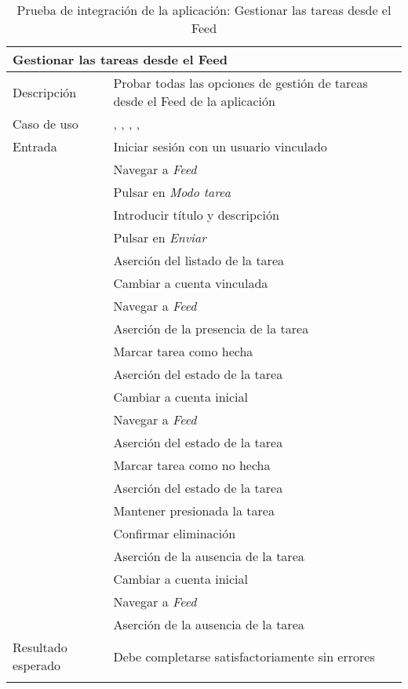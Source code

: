 \newpage
\begin{longtable}{|p{} p{}|}
    \hline
    \multicolumn{2}{|l|}{\textbf{Gestionar las tareas desde el Feed}} \\ \hline 
    Descripción                 & Probar todas las opciones de gestión de tareas desde el Feed de la aplicación \\ \hline
    Caso de uso                 & \nameref{cu:listar_tareas}, \nameref{cu:crear_tarea}, \nameref{cu:marcar_tarea}, \nameref{cu:desmarcar_tarea}, \nameref{cu:eliminar_tarea} \\ \hline
    Entrada                     & Iniciar sesión con un usuario vinculado \\
                                & Navegar a \emph{Feed} \\ 
                                & Pulsar en \emph{Modo tarea} \\
                                & Introducir título y descripción \\
                                & Pulsar en \emph{Enviar} \\
                                & Aserción del listado de la tarea \\
                                & Cambiar a cuenta vinculada \\
                                & Navegar a \emph{Feed} \\ 
                                & Aserción de la presencia de la tarea \\
                                & Marcar tarea como hecha \\
                                & Aserción del estado de la tarea \\
                                & Cambiar a cuenta inicial \\
                                & Navegar a \emph{Feed} \\ 
                                & Aserción del estado de la tarea \\
                                & Marcar tarea como no hecha \\
                                & Aserción del estado de la tarea \\
                                & Mantener presionada la tarea \\
                                & Confirmar eliminación \\
                                & Aserción de la ausencia de la tarea \\
                                & Cambiar a cuenta inicial \\
                                & Navegar a \emph{Feed} \\ 
                                & Aserción de la ausencia de la tarea \\
                                \hline
    Resultado esperado          & Debe completarse satisfactoriamente sin errores \\ \hline
    \caption{Prueba de integración de la aplicación: Gestionar las tareas desde el Feed}
    \label{cp:i:app:gestionar_tareas_feed}
\end{longtable}

